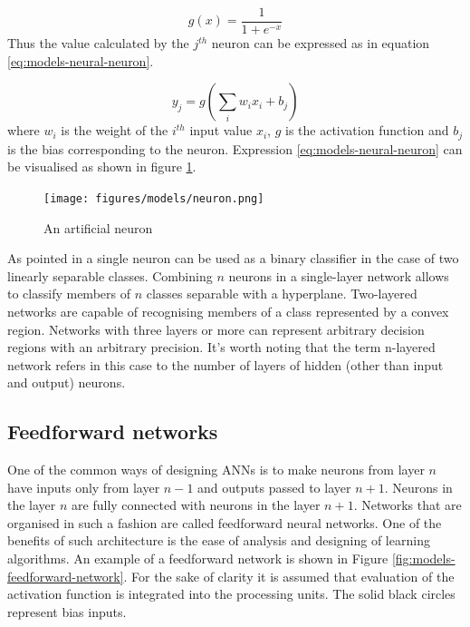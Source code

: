 \begin{equation} \label{eq:models-neural-sigmoid}
g(x) = \frac{1}{1 + e^{-x}}
\end{equation}
Thus the value calculated by the $j^{th}$ neuron can be expressed as in equation \ref{eq:models-neural-neuron}.

\begin{equation} \label{eq:models-neural-neuron}
y_j = g(\sum_{i} w_i x_i + b_j)
\end{equation}
where $w_i$ is the weight of the $i^{th}$ input value $x_i$, $g$ is the activation function and $b_j$ is the bias corresponding to the neuron. Expression \ref{eq:models-neural-neuron} can be visualised as shown in figure \ref{fig:models-neuron}.

\begin{figure}[htp]
\centering
\texttt{[image: figures/models/neuron.png]}
\caption{An artificial neuron}
\label{fig:models-neuron}
\end{figure}
As pointed in \cite{BISHOP1995} a single neuron can be used as a binary classifier in the case of two linearly separable classes. Combining $n$ neurons in a single-layer network allows to classify members of $n$ classes separable with a hyperplane. Two-layered networks are capable of recognising members of a class represented by a convex region. Networks with three layers or more can represent arbitrary decision regions with an arbitrary precision.
It's worth noting that the term n-layered network refers in this case to the number of layers of hidden (other than input and output) neurons.

\subsection{Feedforward networks}
One of the common ways of designing ANNs is to make neurons from layer $n$ have inputs only from layer $n-1$ and outputs passed to layer $n+1$. Neurons in the layer $n$ are fully connected with neurons in the layer $n+1$. Networks that are organised in such a fashion are called feedforward neural networks. One of the benefits of such architecture is the ease of analysis and designing of learning algorithms. 
An example of a feedforward network is shown in Figure \ref{fig:models-feedforward-network}. For the sake of clarity it is assumed that evaluation of the activation function is integrated into the processing units. The solid black circles represent bias inputs.

